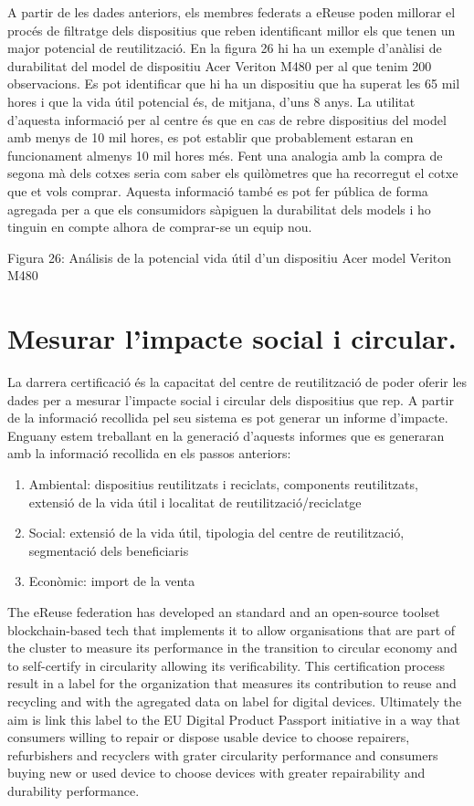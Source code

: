 \documentclass[
]{book}
\begin{document}
A partir de les dades anteriors, els membres federats a eReuse poden millorar el procés de filtratge dels dispositius que reben identificant millor els que tenen un major potencial de reutilització. En la figura 26 hi ha un exemple d'anàlisi de durabilitat del model de dispositiu Acer Veriton M480 per al que tenim 200 observacions. Es pot identificar que hi ha un dispositiu que ha superat les 65 mil hores i que la vida útil potencial és, de mitjana, d'uns 8 anys. La utilitat d'aquesta informació per al centre és que en cas de rebre dispositius del model amb menys de 10 mil hores, es pot establir que probablement estaran en funcionament almenys 10 mil hores més. Fent una analogia amb la compra de segona mà dels cotxes seria com saber els quilòmetres que ha recorregut el cotxe que et vols comprar. Aquesta informació també es pot fer pública de forma agregada per a que els consumidors sàpiguen la durabilitat dels models i ho tinguin en compte alhora de comprar-se un equip nou.

Figura 26: Análisis de la potencial vida útil d'un dispositiu Acer model Veriton M480

\hypertarget{mesurar-limpacte-social-i-circular.}{%
\section{Mesurar l'impacte social i circular.}\label{mesurar-limpacte-social-i-circular.}}

La darrera certificació és la capacitat del centre de reutilització de poder oferir les dades per a mesurar l'impacte social i circular dels dispositius que rep. A partir de la informació recollida pel seu sistema es pot generar un informe d'impacte. Enguany estem treballant en la generació d'aquests informes que es generaran amb la informació recollida en els passos anteriors:

\begin{enumerate}
\def\labelenumi{\arabic{enumi}.}
\item
  Ambiental: dispositius reutilitzats i reciclats, components reutilitzats, extensió de la vida útil i localitat de reutilització/reciclatge
\item
  Social: extensió de la vida útil, tipologia del centre de reutilització, segmentació dels beneficiaris
\item
  Econòmic: import de la venta
\end{enumerate}

The eReuse federation has developed an standard and an open-source toolset blockchain-based tech that implements it to allow organisations that are part of the cluster to measure its performance in the transition to circular economy and to self-certify in circularity allowing its verificability. This certification process result in a label for the organization that measures its contribution to reuse and recycling and with the agregated data on label for digital devices. Ultimately the aim is link this label to the EU Digital Product Passport initiative in a way that consumers willing to repair or dispose usable device to choose repairers, refurbishers and recyclers with grater circularity performance and consumers buying new or used device to choose devices with greater repairability and durability performance.
\end{document}

